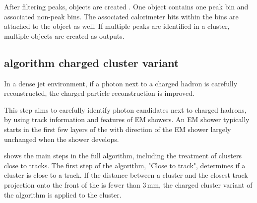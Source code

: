 After  filtering peaks,  \ShowerPeak  objects are created . One \ShowerPeak object contains one peak bin and associated non-peak bins. The associated calorimeter hits within the bins are attached to the \ShowerPeak object as well. If multiple peaks are identified in a cluster, multiple \ShowerPeak objects are created as outputs.



\subsection{\peakFinding algorithm charged cluster variant}
\label{sec:photon2Dtrack}

In a dense jet environment, if a photon next to a charged hadron is carefully reconstructed, the charged particle reconstruction is improved.



This step aims to carefully identify photon candidates next to charged hadrons, by using track information and features of EM showers. An EM shower typically starts in the first few layers of the \ECAL with  direction of the EM shower largely unchanged when the shower develops.


 shows the main steps in the full \peakFinding algorithm, including the treatment of clusters close to tracks. The first step of the algorithm, "Close to track", determines if a cluster is close to a track. If the distance between a cluster and the closest track projection onto the front of the \ECAL is fewer than 3\,mm, the charged cluster variant of the \peakFinding algorithm is applied to the cluster.

